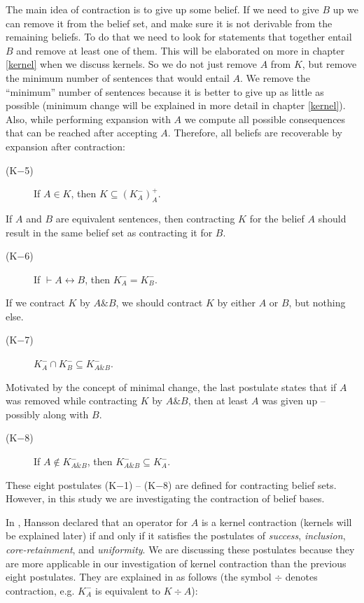The main idea of contraction is to give up some belief. If we need to give $B$ up we can remove it from the belief set, and make sure it is not derivable from the remaining beliefs. To do that we need to look for statements that together entail $B$ and remove at least one of them. This will be elaborated on more in chapter \ref{kernel} when we discuss kernels. So we do not just remove $A$ from $K$, but remove the minimum number of sentences that would entail $A$. We remove the ``minimum'' number of sentences because it is better to give up as little as possible (minimum change will be explained in more detail in chapter \ref{kernel}). Also, while performing expansion with $A$ we compute all possible consequences that can be reached after accepting $A$. Therefore, all beliefs are recoverable by expansion after contraction:
\begin{description}
\item[(K$-$5)] If $A \in K$, then $K \subseteq (K^{-}_{A})^{+}_{A}$.
\end{description}
If $A$ and $B$ are equivalent sentences, then contracting $K$ for the belief $A$ should result in the same belief set as contracting it for $B$.
\begin{description}
\item[(K$-$6)] If $\vdash A \leftrightarrow B$, then $K^{-}_{A} = K^{-}_{B}$.
\end{description}
If we contract $K$ by $A \& B$, we should contract $K$ by either $A$ or $B$, but nothing else.
\begin{description}
\item[(K$-$7)] $K^{-}_{A} \cap K^{-}_{B} \subseteq K^{-}_{A \& B}$.
\end{description}
Motivated by the concept of minimal change, the last postulate states that if $A$ was removed while contracting $K$ by $A \& B$, then at least $A$ was given up -- possibly along with $B$.
\begin{description}
\item[(K$-$8)] If $A \notin K^{-}_{A \& B}$, then $K^{-}_{A \& B} \subseteq K^{-}_{A}$.
\end{description}

These eight postulates (K$-$1) -- (K$-$8) are defined for contracting belief sets. However, in this study we are investigating the contraction of belief bases. 

In \cite{hansson}, Hansson declared that an operator for $A$ is a kernel contraction (kernels will be explained later) if and only if it satisfies the postulates of \textit{success}, \textit{inclusion}, \textit{core-retainment}, and \textit{uniformity}. We are discussing these postulates because they are more applicable in our investigation of kernel contraction than the previous eight postulates. They are explained in \cite{hansson} as follows (the symbol $\div$ denotes contraction, e.g. $K^{-}_{A}$ is equivalent to $K \div A$):

